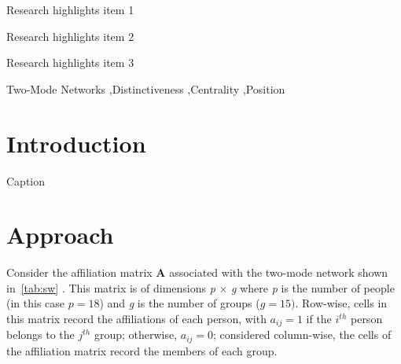 \documentclass[a4paper,fleqn]{cas-sc}
\begin{document}
\begin{abstract}
This template helps you to create a properly formatted \LaTeX\ manuscript.

\noindent\texttt{\textbackslash begin{abstract}} \dots 
\texttt{\textbackslash end{abstract}} and
\verb+\begin{keyword}+ \verb+...+ \verb+\end{keyword}+ 
which
contain the abstract and keywords respectively. 

\noindent Each keyword shall be separated by a \verb+\sep+ command.
\end{abstract}


\begin{highlights}
\item Research highlights item 1
\item Research highlights item 2
\item Research highlights item 3
\end{highlights}

\begin{keywords}
Two-Mode Networks  \sep Distinctiveness \sep Centrality \sep Position
\end{keywords}


\maketitle

\section{Introduction}

\begin{table}[]
    \centering
    
    \caption{Caption}
    \label{tab:sw}
\end{table}

\section{Approach}
Consider the affiliation matrix $\mathbf{A}$ associated with the two-mode network shown in~\ref{tab:sw} \citep{davis1941}. This matrix is of dimensions \textit{p} $\times$ \textit{g} where \textit{p} is the number of people (in this case $p = 18$) and \textit{g} is the number of groups ($g = 15)$. Row-wise, cells in this matrix record the affiliations of each person, with $a_{ij} = 1$ if the $i^{th}$ person belongs to the $j^{th}$ group; otherwise, $a_{ij} = 0$; considered column-wise, the cells of the affiliation matrix record the members of each group. 
\end{document}
